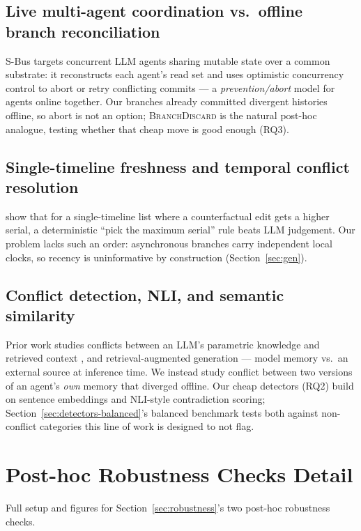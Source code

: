 \documentclass[11pt]{article}
\begin{document}
\subsection{Live multi-agent coordination vs.\ offline branch reconciliation}
S-Bus \citep{khan2026sbus} targets concurrent LLM agents sharing mutable
state over a common substrate: it reconstructs each agent's read set and
uses optimistic concurrency control to abort or retry conflicting commits
--- a \emph{prevention/abort} model for agents online together. Our
branches already committed divergent histories offline, so abort is not an
option; \textsc{BranchDiscard} is the natural post-hoc analogue, testing
whether that cheap move is good enough (RQ3).

\subsection{Single-timeline freshness and temporal conflict resolution}
\citet{reddy2026freshness} show that for a single-timeline list where a
counterfactual edit gets a higher serial, a deterministic ``pick the
maximum serial'' rule beats LLM judgement. Our problem lacks such an order:
asynchronous branches carry independent local clocks, so recency is
uninformative by construction (Section~\ref{sec:gen}).

\subsection{Conflict detection, NLI, and semantic similarity}
Prior work studies conflicts between an LLM's parametric knowledge and
retrieved context \citep{longpre2021knowledge}, and retrieval-augmented
generation \citep{lewis2020rag} --- model memory vs.\ an external source at
inference time. We instead study conflict between two versions of an
agent's \emph{own} memory that diverged offline. Our cheap detectors (RQ2)
build on sentence embeddings \citep{reimers2019sentencebert} and NLI-style
contradiction scoring; Section~\ref{sec:detectors-balanced}'s balanced
benchmark tests both against non-conflict categories this line of work is
designed to not flag.

\section{Post-hoc Robustness Checks Detail}
\label{sec:robustness-detail}

Full setup and figures for Section~\ref{sec:robustness}'s two post-hoc
robustness checks.
\end{document}
